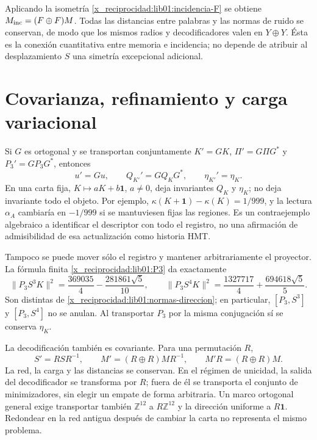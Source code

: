 Aplicando la isometría \eqref{x_reciprocidad:lib01:incidencia-F} se obtiene
\(M_{\rm inc}=(F\oplus F)M\). Todas las distancias entre palabras
y las normas de ruido se conservan, de modo que los mismos radios y
decodificadores valen en \(Y\oplus Y\). Ésta es la conexión
cuantitativa entre memoria e incidencia; no depende de atribuir al
desplazamiento \(S\) una simetría excepcional adicional.

\section{Covarianza, refinamiento y carga variacional}
\label{x_reciprocidad:lib01:covarianza}

Si \(G\) es ortogonal y se transportan conjuntamente
\(K'=GK\), \(\Pi'=G\Pi G^*\) y \(P_3'=GP_3G^*\), entonces
\[
 u'=Gu,\qquad Q_{K'}'=GQ_KG^*,\qquad \eta_{K'}'=\eta_K.
\]
En una carta fija, \(K\mapsto aK+b\mathbf1\), \(a\ne0\), deja
invariantes \(Q_K\) y \(\eta_K\); no deja invariante todo el objeto.
Por ejemplo, \(\kappa(K+\mathbf1)-\kappa(K)=1/999\), y la lectura
\(\alpha_A\) cambiaría en \(-1/999\) si se mantuviesen fijas las
regiones. Es un contraejemplo algebraico a identificar el descriptor con
todo el registro, no una afirmación de admisibilidad de esa actualización
como historia HMT.

Tampoco se puede mover sólo el registro y mantener arbitrariamente el
proyector. La fórmula finita \eqref{x_reciprocidad:lib01:P3} da exactamente
\[
 \|P_3S^3K\|^2=\frac{369035}{4}-\frac{281861\sqrt5}{10},
 \qquad
 \|P_3S^4K\|^2=\frac{1327717}{4}+\frac{694618\sqrt5}{5}.
\]
Son distintas de \eqref{x_reciprocidad:lib01:normas-direccion}; en particular,
\([P_3,S^3]\) y \([P_3,S^4]\) no se anulan. Al transportar
\(P_3\) por la misma conjugación sí se conserva \(\eta_K\).

La decodificación también es covariante. Para una permutación \(R\),
\[
 S'=RSR^{-1},\qquad M'=(R\oplus R)MR^{-1},\qquad
 M'R=(R\oplus R)M.
\]
La red, la carga y las distancias se conservan. En el régimen de unicidad,
la salida del decodificador se transforma por \(R\); fuera de él se
transporta el conjunto de minimizadores, sin elegir un empate de forma
arbitraria. Un marco ortogonal general exige transportar también
\(\mathbb Z^{12}\) a \(R\mathbb Z^{12}\) y la dirección uniforme
a \(R\mathbf1\). Redondear en la red antigua después de cambiar la
carta no representa el mismo problema.

